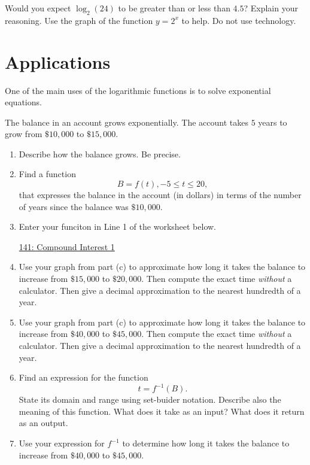 \documentclass{ximera}
\begin{document}
\begin{question} \label{Q4:LogF}
Would you expect $\log_2(24)$ to be greater than or less than $4.5$? Explain your reasoning. Use the graph of the function $y=2^x$ to help. Do not use technology.
\end{question}



\section{Applications}

One of the main uses of the logarithmic functions is to solve exponential equations.


\begin{question}  \label{Q:dfehyyh5h}
The balance in an account grows exponentially. The account takes $5$ years to grow from $\$10,000$ to $\$15,000$. 

\begin{enumerate}
\item Describe how the balance grows. Be precise.

\item Find a function 
\[
B = f(t), -5\leq t \leq 20,
\]
that expresses the balance in the account (in dollars) in terms of the number of years since the balance was $\$10,000$.

\item Enter your funciton in Line 1 of the worksheet below. 

\begin{onlineOnly}
    \begin{center}
\end{center}
\end{onlineOnly}


\href{https://www.desmos.com/calculator/zszhcct8zb}{141: Compound Interest 1}

\item Use your graph from part (c) to approximate how long it takes the balance to increase from $\$15,000$ to $\$20,000$. Then compute the exact time \emph{without} a calculator. Then give a decimal approximation to the nearest hundredth of a year.

\item Use your graph from part (c) to approximate how long it takes the balance to increase from $\$40,000$ to $\$45,000$. Then compute the exact time \emph{without} a calculator. Then give a decimal approximation to the nearest hundredth of a year.

\item Find an expression for the function 
\[ 
      t  = f^{-1}(B) .
\]
State its domain and range using set-buider notation. Describe also the meaning of this function. What does it take as an input? What does it return as an output.

\item Use your expression for $f^{-1}$ to determine how long it takes the balance to increase from  $\$40,000$ to $\$45,000$.

\end{enumerate}
\end{question}
\end{document}
